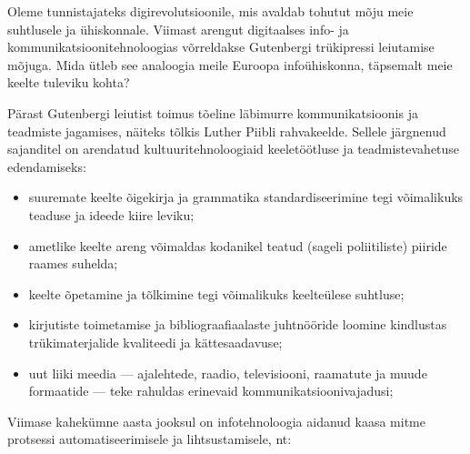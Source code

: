 \documentclass[]{../metanetpaper}
\begin{document}
\clearpage



\begin{multicols}{2}

Oleme tunnistajateks digirevolutsioonile, mis avaldab tohutut mõju meie suhtlusele ja ühiskonnale. 
Viimast arengut digitaalses info- ja kommunikatsiooni\-tehno\-loogias võrreldakse Gutenbergi trükipressi leiutamise mõjuga. 
Mida ütleb see ana\-loogia meile Euroopa infoühiskonna, täpsemalt meie keelte tuleviku kohta?


Pärast Gutenbergi leiutist toimus tõeline läbimurre kommunikatsioonis ja teadmiste jagamises, näiteks tõlkis Luther Piib\-li rahvakeelde. 
Sellele järgnenud sajanditel on arendatud kultuuritehnoloogiaid keeletöötluse ja teadmistevahetuse edendamiseks:

\medskip
\begin{itemize}
      \item suuremate keelte õigekirja ja grammatika standardiseerimine tegi võimalikuks teaduse ja ideede kiire leviku;
      \item ametlike keelte areng võimaldas kodanikel teatud (sageli poliitiliste) pii\-ride raames suhelda;
      \item keelte õpetamine ja tõlkimine tegi võimalikuks keelteülese suhtluse;
      \item kirjutiste toimetamise ja bibliograafia\-alaste juhtnööride loomine kindlustas trükimaterjalide kvaliteedi ja kättesaadavuse;
      \item uut liiki meedia --- ajalehtede, raadio, televisiooni, raamatute ja muude formaatide --- teke rahuldas erinevaid kommunikatsiooni\-vajadusi;
\end{itemize}

Viimase kahekümne aasta jooksul on info\-tehnoloogia aidanud kaasa mitme protsessi automatiseerimisele ja lihtsustamisele, nt:


\end{multicols}
\end{document}
